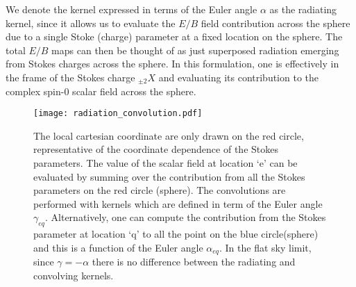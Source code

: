 We denote the kernel expressed in terms of the Euler angle $\alpha$ as the radiating kernel, since it allows us to evaluate the $E/B$ field contribution across the sphere due to a single Stoke (charge) parameter at a fixed location on the sphere. The total $E/B$ maps can then be thought of as just superposed radiation emerging from Stokes charges across the sphere. In this formulation, one is effectively in the frame of the Stokes charge ${}_{\pm2}X$ and evaluating its contribution to the complex spin-0 scalar field across the sphere. 
%
\begin{figure}[!t]
\centering
\texttt{[image: radiation\_convolution.pdf]}
\caption{The local cartesian coordinate are only drawn on the red circle, representative of the coordinate dependence of the Stokes parameters. The value of the scalar field at location `e' can be evaluated by summing over the contribution from all the Stokes parameters on the red circle (sphere). The convolutions are performed with kernels which are defined in term of the Euler angle $\gamma_{eq}$. Alternatively, one can compute the contribution from the Stokes parameter at location `q' to all the point on the blue circle(sphere) and this is a function of the Euler angle $\alpha_{eq}$. In the flat sky limit, since $\gamma=-\alpha$ there is no difference between the radiating and convolving kernels.}
\label{fig:planar_euler_angles}
\end{figure}
%

